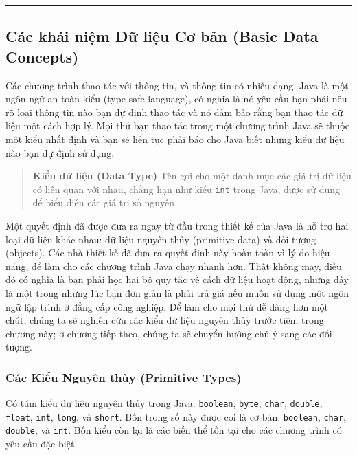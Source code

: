 \begin{center}\rule{0.5\linewidth}{0.5pt}\end{center}

\subsection{Các khái niệm Dữ liệu Cơ bản (Basic Data
Concepts)}\label{cuxe1c-khuxe1i-niux1ec7m-dux1eef-liux1ec7u-cux1a1-bux1ea3n-basic-data-concepts}

Các chương trình thao tác với thông tin, và thông tin có nhiều dạng.
Java là một ngôn ngữ an toàn kiểu (type-safe language), có nghĩa là nó
yêu cầu bạn phải nêu rõ loại thông tin nào bạn dự định thao tác và nó
đảm bảo rằng bạn thao tác dữ liệu một cách hợp lý. Mọi thứ bạn thao tác
trong một chương trình Java sẽ thuộc một kiểu nhất định và bạn sẽ liên
tục phải báo cho Java biết những kiểu dữ liệu nào bạn dự định sử dụng.

\begin{quote}
\textbf{Kiểu dữ liệu (Data Type)} Tên gọi cho một danh mục các giá trị
dữ liệu có liên quan với nhau, chẳng hạn như kiểu \texttt{int} trong
Java, được sử dụng để biểu diễn các giá trị số nguyên.
\end{quote}

Một quyết định đã được đưa ra ngay từ đầu trong thiết kế của Java là hỗ
trợ hai loại dữ liệu khác nhau: dữ liệu nguyên thủy (primitive data) và
đối tượng (objects). Các nhà thiết kế đã đưa ra quyết định này hoàn toàn
vì lý do hiệu năng, để làm cho các chương trình Java chạy nhanh hơn.
Thật không may, điều đó có nghĩa là bạn phải học hai bộ quy tắc về cách
dữ liệu hoạt động, nhưng đây là một trong những lúc bạn đơn giản là phải
trả giá nếu muốn sử dụng một ngôn ngữ lập trình ở đẳng cấp công nghiệp.
Để làm cho mọi thứ dễ dàng hơn một chút, chúng ta sẽ nghiên cứu các kiểu
dữ liệu nguyên thủy trước tiên, trong chương này; ở chương tiếp theo,
chúng ta sẽ chuyển hướng chú ý sang các đối tượng.

\subsubsection{Các Kiểu Nguyên thủy (Primitive
Types)}\label{cuxe1c-kiux1ec3u-nguyuxean-thux1ee7y-primitive-types}

Có tám kiểu dữ liệu nguyên thủy trong Java: \texttt{boolean},
\texttt{byte}, \texttt{char}, \texttt{double}, \texttt{float},
\texttt{int}, \texttt{long}, và \texttt{short}. Bốn trong số này được
coi là cơ bản: \texttt{boolean}, \texttt{char}, \texttt{double}, và
\texttt{int}. Bốn kiểu còn lại là các biến thể tồn tại cho các chương
trình có yêu cầu đặc biệt.

